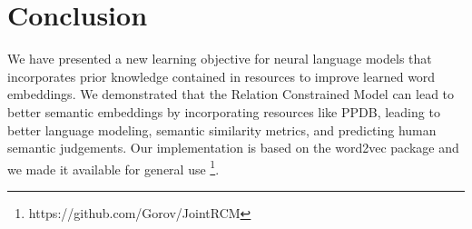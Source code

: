 \documentclass[11pt]{article}
\begin{document}
%
%




\section{Conclusion}
We have presented a new learning objective for neural language models that incorporates
prior knowledge contained in resources to improve learned word embeddings.
We demonstrated that the Relation Constrained Model can lead to better semantic embeddings
by incorporating resources like PPDB, leading to better language modeling, semantic similarity metrics,
and predicting human semantic judgements. Our implementation is based on the word2vec package
and we made it available for general use
\footnote{https://github.com/Gorov/JointRCM}.
\end{document}
